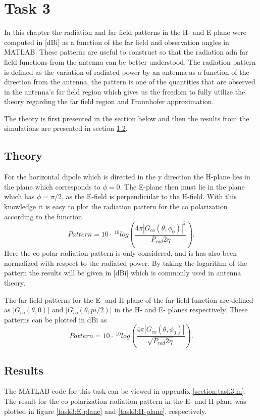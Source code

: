 \chapter{Task 3}
\label{chapter:task3}
In this chapter the radiation and far field patterns  in the H- and E-plane were computed in [dBi] as a function of  the far field and observation angles in MATLAB. These patterns are useful to construct so that the radiation adn far field functions from the antenna can be better understood. The radiation pattern is  defined as the variation of radiated power by an antenna as a function of the direction from the antenna, the pattern is one of the quantities that are observed in the antenna's far field region
which gives us the freedom to fully utilize the theory regarding the far field region and Fraunhofer approximation.

The theory is first presented in the section below and then the results from the simulations are presented in section \ref{chapter3:results}.


\section{Theory}
For the horizontal dipole which is directed in the y direction the H-plane lies in the plane which corresponds to $\phi =0$. The E-plane then must lie in the plane which has $\phi = \pi/2$, as the E-field  is perpendicular to the H-field. With this knowledge it is easy to plot the radiation pattern for the co polarization according to the function 
\begin{equation}
Pattern = 10\cdot~^{10}log\left(\frac{4\pi |G_{co}(\theta, \phi_0)|^2}{P_{rad}2\eta} \right).
\end{equation}
Here the co polar radiation pattern is only considered, and is has also been normalized with respect to the radiated power. By taking the logarithm of the pattern the results will be given in [dBi] which is commonly used in antenna theory.

The far field patterns for the E- and H-plane of the far field function are defined as $|G_{co}(\theta , 0)|$ and $|G_{co}(\theta , pi/2)|$ in the H- and E- planes respectively. These patterns can be plotted in dBi as 
\begin{equation}
Pattern = 10 \cdot ~^{10}log\left(\frac{4\pi |G_{co}(\theta, \phi_0)|}{\sqrt{P_{rad}2\eta}} \right).
\end{equation}
\cite{kildal2000foundations}


\section{Results}
\label{chapter3:results}
The MATLAB code for this task can be viewed in appendix \ref{section:task3.m}. The result for the co polarization radiation pattern in the E- and H-plane was plotted in figure \ref{task3:E-plane} and \ref{task3:H-plane}, respectively.

